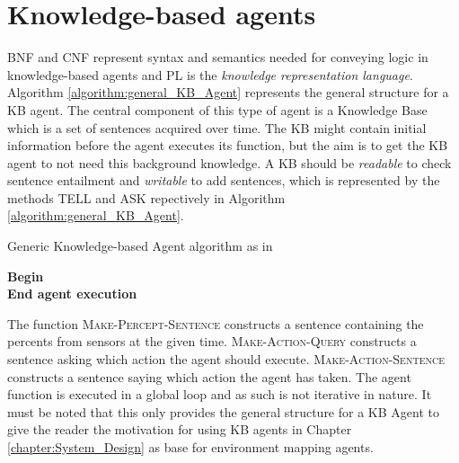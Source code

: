 \section{Knowledge-based agents}
\label{sec:kb_agents}

BNF and CNF represent syntax and semantics needed for conveying logic in knowledge-based agents and PL is the \textit{knowledge representation language}. Algorithm \ref{algorithm:general_KB_Agent} represents the general structure for a KB agent. The central component of this type of agent is a Knowledge Base which is a set of sentences acquired over time. The KB might contain initial information before the agent executes its function, but the aim is to get the KB agent to not need this background knowledge. A KB should be \textit{readable} to check sentence entailment and \textit{writable} to add sentences, which is represented by the methods \textsc{TELL} and \textsc{ASK} repectively in Algorithm \ref{algorithm:general_KB_Agent}.

\vspace{0.5cm}
\begin{algorithm}[H]
\label{algorithm:general_KB_Agent}
\caption{Generic Knowledge-based Agent algorithm as in \citep{russell2016artificial}}
\SetAlgoLined
\DontPrintSemicolon
{}
\textbf{Begin} \\
\Indm 
\textbf{End agent execution}   \\
\end{algorithm}
\vspace{0.5cm}

The function \textsc{Make-Percept-Sentence} constructs a sentence containing the percents from sensors at the given time. \textsc{Make-Action-Query} constructs a sentence asking which action the agent should execute. \textsc{Make-Action-Sentence} constructs a sentence saying which action the agent has taken. The agent function is executed in a global loop and as such is not iterative in nature. It must be noted that this only provides the general structure for a KB Agent to give the reader the motivation for using KB agents in Chapter \ref{chapter:System_Design} as base for environment mapping agents.



